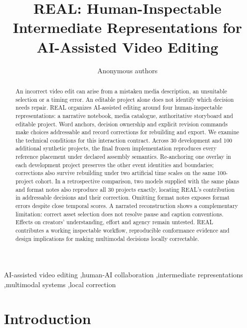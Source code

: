 \documentclass{ceurart}
\begin{document}
\title{REAL: Human-Inspectable Intermediate Representations for AI-Assisted Video Editing}
\author{Anonymous authors}
\begin{abstract}
An incorrect video edit can arise from a mistaken media description, an
unsuitable selection or a timing error. An editable project alone does
not identify which decision needs repair. REAL organizes AI-assisted
editing around four human-inspectable representations: a narrative
notebook, media catalogue, authoritative storyboard and editable
project. Word anchors, decision ownership and explicit revision commands
make choices addressable and record corrections for rebuilding and
export. We examine the technical conditions for this interaction
contract. Across 30 development and 100 additional synthetic projects,
the final frozen implementation reproduces every reference placement
under declared assembly semantics. Re-anchoring one overlay in each
development project preserves the other event identities and boundaries;
corrections also survive rebuilding under two artificial time scales on
the same 100-project cohort. In a retrospective comparison, two models
supplied with the same plans and format notes also reproduce all 30
projects exactly, locating REAL's contribution in addressable decisions
and their correction. Omitting format notes exposes format errors
despite close temporal scores. A narrated reconstruction shows a
complementary limitation: correct asset selection does not resolve pause
and caption conventions. Effects on creators' understanding, effort and
agency remain untested. REAL contributes a working inspectable workflow,
reproducible conformance evidence and design implications for making
multimodal decisions locally correctable.

\end{abstract}
\begin{keywords}
AI-assisted video editing \sep human-AI collaboration \sep intermediate representations \sep multimodal systems \sep local correction
\end{keywords}
\maketitle
\section{Introduction}\label{introduction}
\end{document}
